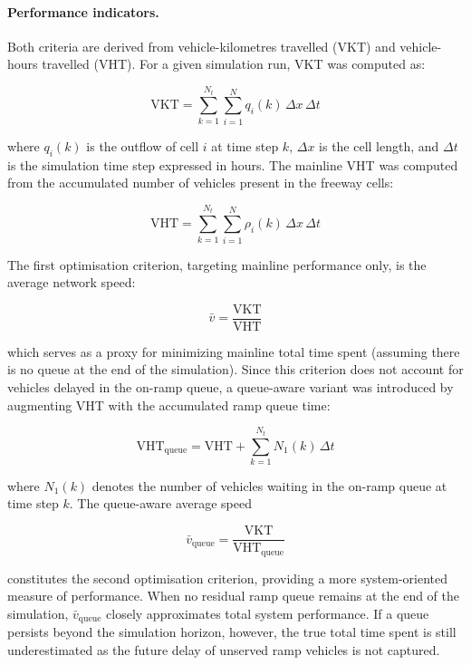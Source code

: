 \paragraph{Performance indicators.}

Both criteria are derived from vehicle-kilometres travelled (VKT) and
vehicle-hours travelled (VHT). For a given simulation run, VKT was computed as:

\begin{equation}
    \mathrm{VKT}
    =
    \sum_{k=1}^{N_t}
    \sum_{i=1}^{N}
    q_i(k)\,\Delta x\,\Delta t
\end{equation}

where $q_i(k)$ is the outflow of cell $i$ at time step $k$, $\Delta x$ is the
cell length, and $\Delta t$ is the simulation time step expressed in hours. The
mainline VHT was computed from the accumulated number of vehicles present in
the freeway cells:

\begin{equation}
    \mathrm{VHT}
    =
    \sum_{k=1}^{N_t}
    \sum_{i=1}^{N}
    \rho_i(k)\,\Delta x\,\Delta t
\end{equation}

The first optimisation criterion, targeting mainline performance only, is the
average network speed:

\begin{equation}
    \bar{v}
    =
    \frac{\mathrm{VKT}}{\mathrm{VHT}}
\end{equation}

which serves as a proxy for minimizing mainline total time spent (assuming there is no queue at the end of the simulation). Since this
criterion does not account for vehicles delayed in the on-ramp queue, a
queue-aware variant was introduced by augmenting VHT with the accumulated
ramp queue time:

\begin{equation}
    \mathrm{VHT}_{\mathrm{queue}}
    =
    \mathrm{VHT}
    +
    \sum_{k=1}^{N_t}
    N_1(k)\,\Delta t
\end{equation}

where $N_1(k)$ denotes the number of vehicles waiting in the on-ramp queue at
time step $k$. The queue-aware average speed

\begin{equation}
    \bar{v}_{\mathrm{queue}}
    =
    \frac{\mathrm{VKT}}{\mathrm{VHT}_{\mathrm{queue}}}
\end{equation}

constitutes the second optimisation criterion, providing a more system-oriented
measure of performance. When no residual ramp queue remains at the end of the
simulation, $\bar{v}_{\mathrm{queue}}$ closely approximates total system
performance. If a queue persists beyond the simulation horizon, however, the
true total time spent is still underestimated as the future delay of unserved
ramp vehicles is not captured.

